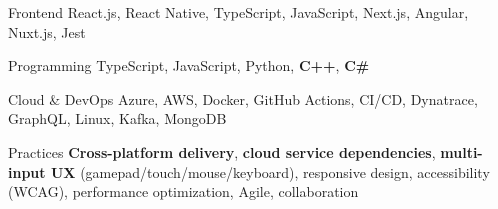 
\begin{cvskills}

  \cvskill
  {Frontend}
  {React.js, React Native, TypeScript, JavaScript, Next.js, Angular, Nuxt.js, Jest}

  \cvskill
  {Programming}
  {TypeScript, JavaScript, Python, \textbf{C++}, \textbf{C\#}}

  \cvskill
  {Cloud \& DevOps}
  {Azure, AWS, Docker, GitHub Actions, CI/CD, Dynatrace, GraphQL, Linux, Kafka, MongoDB}

  \cvskill
  {Practices}
  {\textbf{Cross-platform delivery}, \textbf{cloud service dependencies}, \textbf{multi-input UX} (gamepad/touch/mouse/keyboard), responsive design, accessibility (WCAG), performance optimization, Agile, collaboration}

\end{cvskills}
